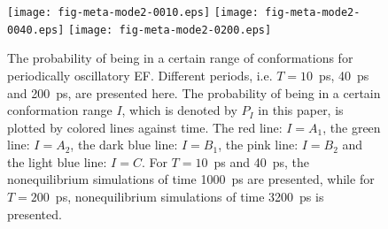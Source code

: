 \documentclass[a4paper,preprint,unsortedaddress,onecolumn]{revtex4-1}
\begin{document}
\begin{figure}
  \centering
  \texttt{[image: fig-meta-mode2-0010.eps]}
  \texttt{[image: fig-meta-mode2-0040.eps]}
  \texttt{[image: fig-meta-mode2-0200.eps]}
  \caption{ The probability of being in a certain range of conformations for
    periodically oscillatory EF. Different periods,
    i.e. $T=10$~ps, 40~ps and 200~ps, are presented here.  The
    probability of being in a certain conformation range $I$, which is
    denoted by $P_I$ in this paper, is plotted by colored lines against
    time. The red line: $I = A_1$, the green line: $I = A_2$, the dark
    blue line: $I = B_1$, the pink line: $I = B_2$ and the light blue
    line: $I = C$. For $T=10$~ps and 40~ps, the nonequilibrium
    simulations of time 1000~ps are presented, while for $T=200$~ps,
    nonequilibrium simulations of time 3200~ps is presented.  }
  \label{fig:tmp9}
\end{figure}
\end{document}

